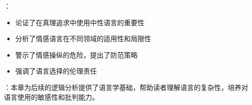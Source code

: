 {：
\begin{itemize}
  \item 论证了在真理追求中使用中性语言的重要性
  \item 分析了情感语言在不同领域的适用性和局限性
  \item 警示了情感操纵的危险，提出了防范策略
  \item 强调了语言选择的伦理责任
\end{itemize}

：本章为后续的逻辑分析提供了语言学基础，帮助读者理解语言的复杂性，培养对语言使用的敏感性和批判能力。
}

\vspace{1em}
